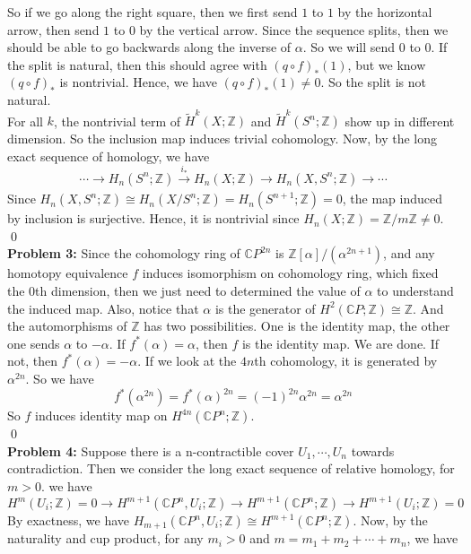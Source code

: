 \documentclass[12pt]{amsart}
\newcommand{\C}{\mathbb{C}}
\newcommand{\Z}{\mathbb{Z}}
\begin{document}
So if we go along the right square, then we first send $1$ to $1$ by the horizontal arrow, then send $1$ to 0 by the vertical arrow. Since the sequence splits, then we should be able to go backwards along the inverse of $\alpha$. So we will send $0$ to $0$. If the split is natural, then this should agree with $(q\circ f)_\ast(1)$, but we know $(q\circ f)_\ast$ is nontrivial. Hence, we have $(q\circ f)_\ast(1)\neq 0$. So the split is not natural.\\
For all $k$, the nontrivial term of $\tilde{H}^k(X;\Z)$ and $\tilde{H}^k(S^n;\Z)$ show up in different dimension. So the inclusion map induces trivial cohomology. Now, by the long exact sequence of homology, we have 
\[\cdots \to H_n(S^n;\Z)\xrightarrow[]{i_\ast} H_n(X;\Z)\to H_n(X,S^n;\Z)\to \cdots \]
Since $H_n(X,S^n;\Z )\cong H_n(X/S^n;\Z)=H_n(S^{n+1};\Z)=0$, the map induced by inclusion is surjective. Hence, it is nontrivial since $H_n(X;\Z)=\Z/m\Z\neq 0$. 
\qed\\
\textbf{Problem 3:} Since the cohomology ring of $\C P^{2n}$ is $\Z[\alpha]/(\alpha^{2n+1})$, and any homotopy equivalence $f$ induces isomorphism on cohomology ring, which fixed the 0th dimension, then we just need to determined the value of $\alpha$ to understand the induced map. Also, notice that $\alpha$ is the generator of $H^2(\C P;\Z)\cong \Z$. And the automorphisms of $\Z$ has two possibilities. One is the identity map, the other one sends $\alpha$ to $-\alpha$. 
If $f^\ast(\alpha)=\alpha$, then $f$ is the identity map. We are done. If not, then $f^{\ast}(\alpha)=-\alpha$. If we look at the $4n$th cohomology, it is generated by $\alpha^{2n}$. So we have 
\[f^\ast(\alpha^{2n})=f^\ast(\alpha)^{2n}=(-1)^{2n}\alpha^{2n}=\alpha^{2n}\]
So $f$ induces identity map on $H^{4n}(\C P^n;\Z)$.
\\\qed\\
\textbf{Problem 4:} Suppose there is a n-contractible cover $U_1,\cdots,U_n$ towards contradiction. Then we consider the long exact sequence of relative homology, for $m>0$. we have 
\[H^m(U_i;\Z)=0\to H^{m+1}(\C P^n,U_i;\Z)\to H^{m+1}(\C P^n;\Z)\to H^{m+1}(U_i;\Z)=0\]
By exactness, we have $H_{m+1}(\C P^n,U_i;\Z)\cong H^{m+1}(\C P^n;\Z)$. Now, by the naturality and cup product, for any $m_i>0$ and $m=m_1+m_2+\cdots+m_n$, we have 
\begin{center}
\end{center}
\end{document}
